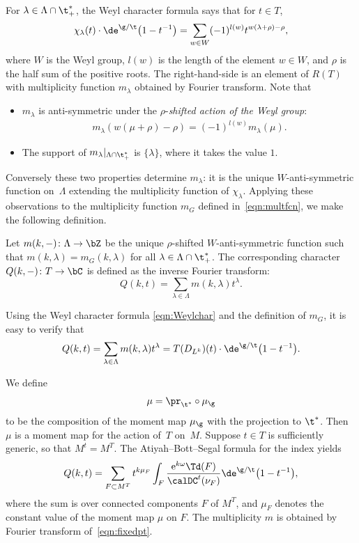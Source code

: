 For $\lambda \in \Lambda\cap \t_+^\ast$, the Weyl character formula says that for $t \in T$,
\begin{gather}\label{eqn:Weylchar}
\chi_\lambda(t) \cdot \de^{\g/\t}\big(1-t^{-1}\big)=\sum_{w\in W} (-1)^{l(w)}t^{w(\lambda+\rho)-\rho},
\end{gather}
where $W$ is the Weyl group, $l(w)$ is the length of the element $w \in W$, and $\rho$ is the half sum of the positive roots. The right-hand-side is an element of $R(T)$ with multiplicity function $m_\lambda$ obtained by Fourier transform. Note that
\begin{itemize}\itemsep=0pt
\item $m_\lambda$ is anti-symmetric under the $\rho$-\emph{shifted action of the Weyl group}:
\begin{gather*}%
m_\lambda(w(\mu+\rho)-\rho)=(-1)^{l(w)}m_\lambda(\mu).
\end{gather*}
\item The support of $m_\lambda|_{\Lambda \cap \t_+^\ast}$ is $\{\lambda\}$, where it takes the value $1$.
\end{itemize}
Conversely these two properties determine $m_\lambda$: it is the unique $W$-anti-symmetric function on~$\Lambda$ extending the multiplicity function of $\chi_\lambda$. Applying these observations to the multiplicity function $m_G$ defined in~\eqref{eqn:multfcn}, we make the following definition.
\begin{Definition}Let $m(k,-)\colon \Lambda \rightarrow \bZ$ be the unique $\rho$-shifted $W$-anti-symmetric function such that $m(k,\lambda)=m_G(k,\lambda)$ for all $\lambda \in \Lambda \cap \t_+^\ast$. The corresponding character $Q(k,-) \colon T \rightarrow \bC$ is defined as the inverse Fourier transform:
\[ Q(k,t)=\sum_{\lambda \in \Lambda} m(k,\lambda)t^\lambda.\]
\end{Definition}

Using the Weyl character formula \eqref{eqn:Weylchar} and the definition of $m_G$, it is easy to verify that
\begin{gather*}%
Q(k,t)=\sum_{\lambda \in \Lambda} m(k,\lambda)t^\lambda=\index_T(D_{L^k})(t)\cdot \de^{\g/\t}\big(1-t^{-1}\big).
\end{gather*}

We define
\[ \mu=\pr_{\t^\ast}\circ \mu_\g \]
to be the composition of the moment map $\mu_\g$ with the projection to $\t^\ast$. Then $\mu$ is a moment map for the action of~$T$ on~$M$. Suppose $t\in T$ is sufficiently generic, so that $M^t=M^T$. The Atiyah--Bott--Segal formula for the index yields
\begin{gather}\label{eqn:fixedpt}
Q(k,t)=\sum_{F \subset M^T}t^{k\mu_F}\int_F \frac{{\rm e}^{k\omega}\Td(F)}{\calDC^t(\nu_F)}\de^{\g/\t}\big(1-t^{-1}\big),
\end{gather}
where the sum is over connected components $F$ of $M^T$, and $\mu_F$ denotes the constant value of the moment map $\mu$ on $F$. The multiplicity $m$ is obtained by Fourier transform of~\eqref{eqn:fixedpt}.

